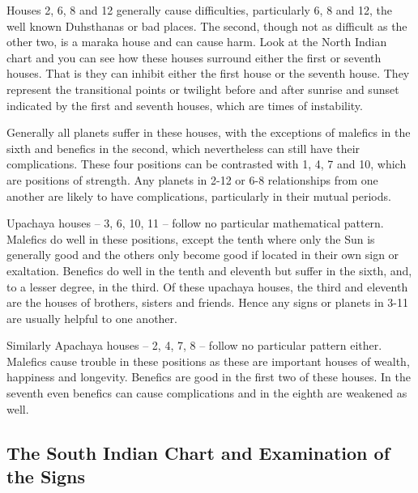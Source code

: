  


 

Houses 2, 6, 8 and 12 generally cause difficulties, particularly 6, 8 and 12, the well known Duhsthanas or bad places. The second, though not as difficult as the other two, is a maraka house and can cause harm.  Look at the North Indian chart and you can see how these houses surround either the first or seventh houses. That is they can inhibit either the first house or the seventh house. They represent the transitional points or twilight before and after sunrise and sunset indicated by the first and seventh houses, which are times of instability.

 

Generally all planets suffer in these houses, with the exceptions of malefics in the sixth and benefics in the second, which nevertheless can still have their complications. These four positions can be contrasted with 1, 4, 7 and 10, which are positions of strength. Any planets in 2-12 or 6-8 relationships from one another are likely to have complications, particularly in their mutual periods.

 


 

Upachaya houses – 3, 6, 10, 11 – follow no particular mathematical pattern. Malefics do well in these positions, except the tenth where only the Sun is generally good and the others only become good if located in their own sign or exaltation. Benefics do well in the tenth and eleventh but suffer in the sixth, and, to a lesser degree, in the third. Of these upachaya houses, the third and eleventh are the houses of brothers, sisters and friends. Hence any signs or planets in 3-11 are usually helpful to one another.

 

Similarly Apachaya houses – 2, 4, 7, 8 – follow no particular pattern either. Malefics cause trouble in these positions as these are important houses of wealth, happiness and longevity. Benefics are good in the first two of these houses. In the seventh even benefics can cause complications and in the eighth are weakened as well.

 

\subsection{The South Indian Chart and Examination of the Signs}
 

